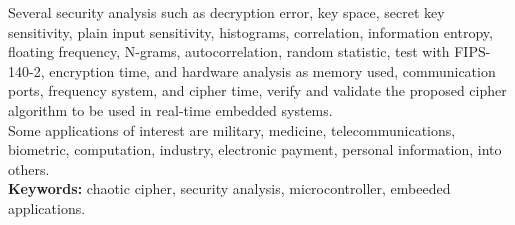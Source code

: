 Several security analysis such as decryption error, key space, secret key sensitivity, plain input sensitivity, histograms, correlation, information entropy, floating frequency, N-grams, autocorrelation, random statistic, test with FIPS-140-2, encryption time, and hardware analysis as memory used, communication ports, frequency system, and cipher time, verify and validate the proposed cipher algorithm to be used in real-time embedded systems. \\

Some applications of interest are military, medicine, telecommunications, biometric, computation, industry, electronic payment, personal information, into others. \\

\vspace{0.4cm}
\textbf{Keywords:} chaotic cipher, security analysis, microcontroller, embeeded applications.  
